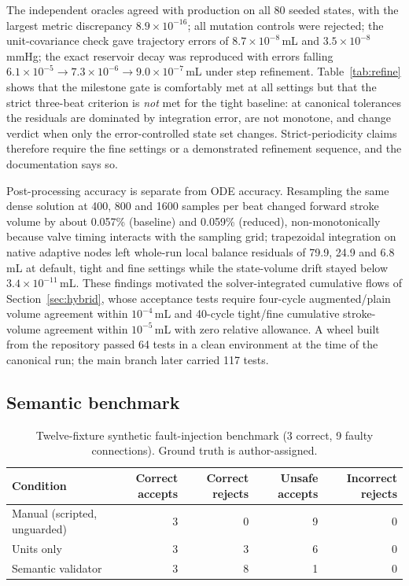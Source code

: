 \documentclass[11pt,letterpaper]{article}
\begin{document}
The independent oracles agreed with production on all 80 seeded states, with the largest metric discrepancy $8.9\times10^{-16}$; all mutation controls were rejected; the unit-covariance check gave trajectory errors of $8.7\times10^{-8}$\,mL and $3.5\times10^{-8}$\,mmHg; the exact reservoir decay was reproduced with errors falling $6.1\times10^{-5}\to7.3\times10^{-6}\to9.0\times10^{-7}$\,mL under step refinement. Table~\ref{tab:refine} shows that the milestone gate is comfortably met at all settings but that the strict three-beat criterion is \emph{not} met for the tight baseline: at canonical tolerances the residuals are dominated by integration error, are not monotone, and change verdict when only the error-controlled state set changes. Strict-periodicity claims therefore require the fine settings or a demonstrated refinement sequence, and the documentation says so.

Post-processing accuracy is separate from ODE accuracy. Resampling the same dense solution at 400, 800 and 1600 samples per beat changed forward stroke volume by about 0.057\% (baseline) and 0.059\% (reduced), non-monotonically because valve timing interacts with the sampling grid; trapezoidal integration on native adaptive nodes left whole-run local balance residuals of 79.9, 24.9 and 6.8\,mL at default, tight and fine settings while the state-volume drift stayed below $3.4\times10^{-11}$\,mL. These findings motivated the solver-integrated cumulative flows of Section~\ref{sec:hybrid}, whose acceptance tests require four-cycle augmented/plain volume agreement within $10^{-4}$\,mL and 40-cycle tight/fine cumulative stroke-volume agreement within $10^{-5}$\,mL with zero relative allowance. A wheel built from the repository passed 64 tests in a clean environment at the time of the canonical run; the main branch later carried 117 tests.

\subsection{Semantic benchmark}

\begin{table}[t]
\centering\small
\caption{Twelve-fixture synthetic fault-injection benchmark (3 correct, 9 faulty connections). Ground truth is author-assigned.}
\label{tab:benchmark}
\begin{tabular}{lrrrr}
\toprule
Condition & Correct accepts & Correct rejects & Unsafe accepts & Incorrect rejects \\
\midrule
Manual (scripted, unguarded) & 3 & 0 & 9 & 0 \\
Units only & 3 & 3 & 6 & 0 \\
Semantic validator & 3 & 8 & 1 & 0 \\
\bottomrule
\end{tabular}
\end{table}
\end{document}
